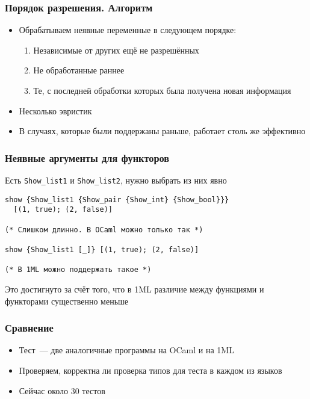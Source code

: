 \documentclass{beamer}
\begin{document}
\begin{frame}\frametitle{Порядок разрешения. Алгоритм}
\begin{itemize}
  \item Обрабатываем неявные переменные в следующем порядке:
  \begin{enumerate}
    \item Независимые от других ещё не разрешённых
    \item Не обработанные раннее
    \item Те, с последней обработки которых была получена новая информация
  \end{enumerate}
  \item Несколько эвристик
  \item В случаях, которые были поддержаны раньше, работает столь же эффективно
\end{itemize}
\end{frame}

\lstset{language=caml}
\begin{frame}[fragile]\frametitle{Неявные аргументы для функторов}
Есть \texttt{Show\_list1} и \texttt{Show\_list2}, нужно выбрать из них явно
\begin{lstlisting}[style=base2]
show {Show_list1 {Show_pair {Show_int} {Show_bool}}}
  [(1, true); (2, false)]

(* Слишком длинно. В OCaml можно только так *)

show {Show_list1 [_]} [(1, true); (2, false)]

(* В 1ML можно поддержать такое *)
\end{lstlisting}
Это достигнуто за счёт того, что в 1ML различие между функциями и функторами существенно меньше
\end{frame}

\begin{frame}\frametitle{Сравнение}
\begin{itemize}
  \item Тест~--- две аналогичные программы на OCaml и на 1ML
  \item Проверяем, корректна ли проверка типов для теста в каждом из языков
  \item Сейчас около 30 тестов
\end{itemize}
\end{frame}
\end{document}
